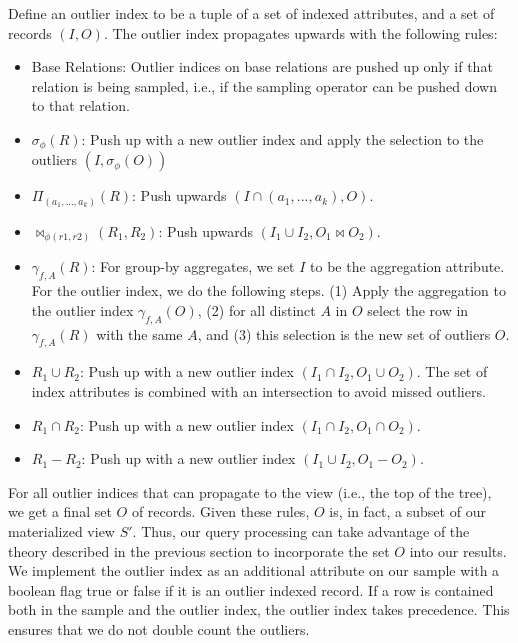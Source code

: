 \begin{definition}
Define an outlier index to be a tuple of a set of indexed attributes, and a set of records $(I,O)$. The outlier index propagates upwards with the following rules: 
\begin{itemize}[noitemsep]
\item Base Relations: Outlier indices on base relations are pushed up only if that relation is being sampled, i.e., if the sampling operator can be pushed down to that relation.
\item $\sigma_{\phi}(R)$: Push up with a new outlier index and apply the selection to the outliers $(I,\sigma_{\phi}(O))$ 
\item $\Pi_{(a_1,...,a_k)}(R)$: Push upwards  $(I \cap (a_1,...,a_k), O)$.
\item $\bowtie_{\phi (r1,r2)}(R_1,R_2)$: Push upwards $(I_{1} \cup I_{2}, O_1 \bowtie O_2)$. 
\item $\gamma_{f,A}(R)$: For group-by aggregates, we set $I$ to be the aggregation attribute. For the outlier index, we do the following steps. (1) Apply the aggregation to the outlier index $\gamma_{f,A}(O)$, (2) for all distinct $A$ in $O$ select the row in $\gamma_{f,A}(R)$ with the same $A$, and (3) this selection is the new set of outliers $O$. 
\item $R_1 \cup R_2$: Push up with a new outlier index $(I_1 \cap I_2, O_1 \cup O_2)$. The set of index attributes is combined with an intersection to avoid missed outliers.
\item $R_1 \cap R_2$: Push up with a new outlier index $(I_1 \cap I_2, O_1 \cap O_2)$.
\item $R_1 - R_2$: Push up with a new outlier index $(I_1 \cup I_2, O_1 - O_2)$.
\end{itemize}
\end{definition}

For all outlier indices that can propagate to the view (i.e., the top of the tree), we get a final set $O$ of records. 
Given these rules, $O$ is, in fact, a subset of our materialized view $S'$.
Thus, our query processing can take advantage of the theory described in the previous section to incorporate the set $O$ into our results.
We implement the outlier index as an additional attribute on our sample with a boolean flag true or false if it is an outlier indexed record.
If a row is contained both in the sample and the outlier index, the outlier index takes precedence.
This ensures that we do not double count the outliers.

